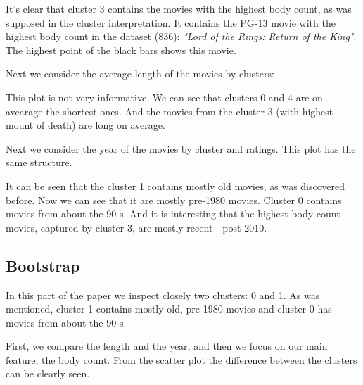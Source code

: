 \documentclass[a4paper,14pt]{article}
\begin{document}
It's clear that cluster 3 contains the movies with the highest body count, as was supposed in the cluster interpretation. It contains the PG-13 movie with the highest body count in the dataset (836): \textit{"Lord of the Rings: Return of the King"}. The highest point of the black bars shows this movie. 

Next we consider the average length of the movies by clusters: 
\begin{center}
\end{center}
 
This plot is not very informative. We can see that clusters 0 and 4 are on avearage the shortest ones. And the movies from the cluster 3 (with highest mount of death) are long on average. 

Next we consider the year of the movies by cluster and ratings. This plot has the same structure. 

\begin{center}
\end{center}
 
It can be seen that the cluster 1 contains mostly old movies, as was discovered before. Now we can see that it are mostly pre-1980 movies. Cluster 0 contains movies from about  the 90-s.
And it is interesting that the highest body count movies, captured by cluster 3, are mostly recent - post-2010.




\subsection{Bootstrap}

In this part of the paper we inspect closely two clusters: 0 and 1. As was mentioned, cluster 1 contains mostly old, pre-1980 movies and cluster 0 has movies from about the 90-s.

First, we compare the length and the year, and then we focus on our main feature, the body count. From the scatter plot the difference between the clusters can be clearly seen.
            
\begin{center}
\end{center}
 
\end{document}
